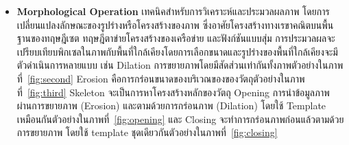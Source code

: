 \documentclass[12pt,oneside,openright,a4paper]{cpe-thai-project}
\begin{document}
\begin{itemize}

\item\textbf{Morphological Operation} เทคนิคสำหรับการวิเคราะห์และประมวลผลภาพ โดยการเปลี่ยนแปลงลักษณะของรูปร่างหรือโครงสร้างของภาพ ซึ่งอาศัยโครงสร้างทางเรขาคณิตบนพื้นฐานของทฤษฎีเซต ทฤษฎีตาข่ายโครงสร้างของเครือข่าย และฟังก์ชันแบบสุ่ม การประมวลผลจะเปรียบเทียบพิกเซลในภาพกับพื้นที่ใกล้เคียงโดยการเลือกขนาดและรูปร่างของพื้นที่ใกล้เคียงจะมีตัวดำเนินการหลายแบบ เช่น Dilation การขยายภาพโดยมีสัดส่วนเท่ากันทั้งภาพตัวอย่างในภาพที่~\ref{fig:second} Erosion คือการกร่อนขนาดของบริเวณของของวัตถุตัวอย่างในภาพที่~\ref{fig:third} Skeleton จะเป็นการหาโครงสร้างหลักของวัตถุ Opening การนำข้อมูลภาพ ผ่านการขยายภาพ (Erosion) และตามด้วยการกร่อนภาพ (Dilation) โดยใช้ Template เหมือนกันตัวอย่างในภาพที่~\ref{fig:opening} และ Closing จะทำการกร่อนภาพก่อนแล้วตามด้วยการขยายภาพ โดยใช้ template ชุดเดียวกันตัวอย่างในภาพที่~\ref{fig:closing} \cite{22}


\end{itemize}
\end{document}

